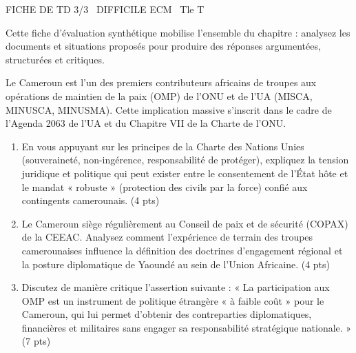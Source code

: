 \documentclass[11pt]{article}
\begin{document}
\begin{tcolorbox}[enhanced,colback=popink,colframe=popink,arc=10pt,boxrule=0pt,left=12pt,right=12pt,top=9pt,bottom=9pt]
{\color{white}\popxbold\small FICHE DE TD 3/3 \textbullet\ DIFFICILE \hfill ECM \textbullet\ Tle T\par}
\end{tcolorbox}
\vspace{4pt}
\noindent Cette fiche d'évaluation synthétique mobilise l'ensemble du chapitre : analysez les documents et situations proposés pour produire des réponses argumentées, structurées et critiques.

\begin{exercice}
Le Cameroun est l'un des premiers contributeurs africains de troupes aux opérations de maintien de la paix (OMP) de l'ONU et de l'UA (MISCA, MINUSCA, MINUSMA). Cette implication massive s'inscrit dans le cadre de l'Agenda 2063 de l'UA et du Chapitre VII de la Charte de l'ONU.
\begin{enumerate}
    \item En vous appuyant sur les principes de la Charte des Nations Unies (souveraineté, non-ingérence, responsabilité de protéger), expliquez la tension juridique et politique qui peut exister entre le consentement de l'État hôte et le mandat « robuste » (protection des civils par la force) confié aux contingents camerounais. (4 pts)
    \item Le Cameroun siège régulièrement au Conseil de paix et de sécurité (COPAX) de la CEEAC. Analysez comment l'expérience de terrain des troupes camerounaises influence la définition des doctrines d'engagement régional et la posture diplomatique de Yaoundé au sein de l'Union Africaine. (4 pts)
    \item Discutez de manière critique l'assertion suivante : « La participation aux OMP est un instrument de politique étrangère « à faible coût » pour le Cameroun, qui lui permet d'obtenir des contreparties diplomatiques, financières et militaires sans engager sa responsabilité stratégique nationale. » (7 pts)
\end{enumerate}
\end{exercice}
\end{document}
